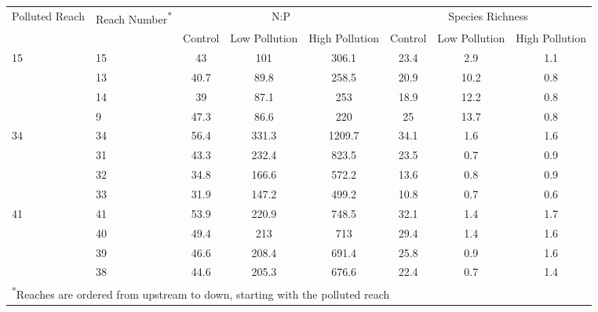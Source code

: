 \begin{tabular}{ll|ccc|ccc} 
 \toprule Polluted Reach & Reach Number\textsuperscript{*} & \multicolumn{3}{c|}{N:P} & \multicolumn{3}{c}{Species Richness} \\ 
 & & Control & Low Pollution & High Pollution & Control & Low Pollution & High Pollution \\ 
 \midrule 
\multirow{4}{*}{15} & 15 & 43 & 101 & 306.1 & 23.4 & 2.9 & 1.1 \\ 
  & 13 & 40.7 & 89.8 & 258.5 & 20.9 & 10.2 & 0.8 \\ 
  & 14 & 39 & 87.1 & 253 & 18.9 & 12.2 & 0.8 \\ 
  & 9 & 47.3 & 86.6 & 220 & 25 & 13.7 & 0.8 \\ 
 \midrule 
\multirow{4}{*}{34} & 34 & 56.4 & 331.3 & 1209.7 & 34.1 & 1.6 & 1.6 \\ 
  & 31 & 43.3 & 232.4 & 823.5 & 23.5 & 0.7 & 0.9 \\ 
  & 32 & 34.8 & 166.6 & 572.2 & 13.6 & 0.8 & 0.9 \\ 
  & 33 & 31.9 & 147.2 & 499.2 & 10.8 & 0.7 & 0.6 \\ 
 \midrule 
\multirow{4}{*}{41} & 41 & 53.9 & 220.9 & 748.5 & 32.1 & 1.4 & 1.7 \\ 
  & 40 & 49.4 & 213 & 713 & 29.4 & 1.4 & 1.6 \\ 
  & 39 & 46.6 & 208.4 & 691.4 & 25.8 & 0.9 & 1.6 \\ 
  & 38 & 44.6 & 205.3 & 676.6 & 22.4 & 0.7 & 1.4 \\ 
 \midrule 
\multicolumn{8}{l}{\footnotesize \textsuperscript{*}Reaches are ordered from upstream to down, starting with the polluted reach} \\ 
 \bottomrule \end{tabular} 
